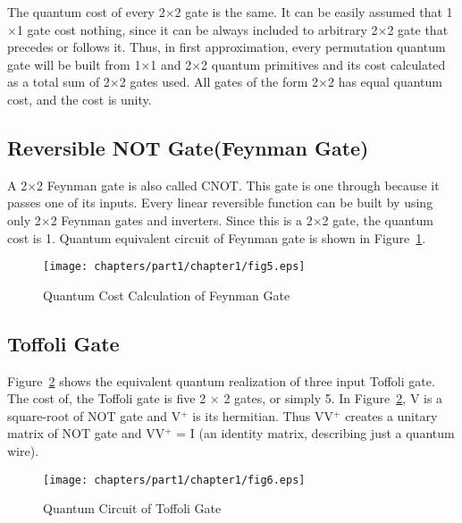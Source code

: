 \begin{property}\textnormal{
The quantum cost of every 2$\times$2 gate is the same. It can be easily assumed that 1$\times$1 gate cost nothing, since it can be always included to arbitrary 2$\times$2 gate that precedes or follows it. Thus, in first approximation, every permutation quantum gate will be built from 1$\times$1 and 2$\times$2 quantum primitives and its cost calculated as a total sum of 2$\times$2 gates used. All gates of the form 2$\times$2 has equal quantum cost, and the cost is unity.}
\end{property}

\subsection{Reversible NOT Gate(Feynman Gate)}

\begin{example}\textnormal{
A 2$\times$2 Feynman gate is also called CNOT. This gate is one through because it passes one of its inputs. Every linear reversible function can be built by using only 2$\times$2 Feynman gates and inverters. Since this is a 2$\times$2 gate, the quantum cost is 1. Quantum equivalent circuit of Feynman gate is shown in Figure~\ref{fig:p1_c1_fig5}.}
\end{example}

\begin{figure}[h]
\centering
\texttt{[image: chapters/part1/chapter1/fig5.eps]}
\caption{Quantum Cost Calculation of Feynman Gate}
\label{fig:p1_c1_fig5}
\end{figure}

\subsection{Toffoli Gate}
Figure~\ref{fig:p1_c1_fig6} shows the equivalent quantum realization of three input Toffoli gate. The cost of, the Toffoli gate is five 2 $\times$ 2 gates, or simply 5. In Figure~\ref{fig:p1_c1_fig6}, V is a square-root of NOT gate and V$^+$ is its hermitian. Thus VV$^+$ creates a unitary matrix of NOT gate and VV$^+$ = I (an identity matrix, describing just a quantum wire).

\begin{figure}[h]
\centering
\texttt{[image: chapters/part1/chapter1/fig6.eps]}
\caption{Quantum Circuit of Toffoli Gate}
\label{fig:p1_c1_fig6}
\end{figure}

